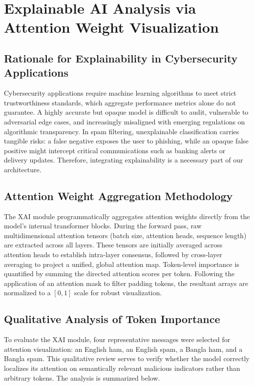 \documentclass[journal]{IEEEtran}
\begin{document}
\section{Explainable AI Analysis via Attention Weight Visualization}

\subsection{Rationale for Explainability in Cybersecurity Applications}

Cybersecurity applications require machine learning algorithms to meet strict trustworthiness standards, which aggregate performance metrics alone do not guarantee. A highly accurate but opaque model is difficult to audit, vulnerable to adversarial edge cases, and increasingly misaligned with emerging regulations on algorithmic transparency. In spam filtering, unexplainable classification carries tangible risks: a false negative exposes the user to phishing, while an opaque false positive might intercept critical communications such as banking alerts or delivery updates. Therefore, integrating explainability is a necessary part of our architecture.

\subsection{Attention Weight Aggregation Methodology}

The XAI module programmatically aggregates attention weights directly from the model's internal transformer blocks. During the forward pass, raw multidimensional attention tensors (batch size, attention heads, sequence length) are extracted across all layers. These tensors are initially averaged across attention heads to establish intra-layer consensus, followed by cross-layer averaging to project a unified, global attention map. Token-level importance is quantified by summing the directed attention scores per token. Following the application of an attention mask to filter padding tokens, the resultant arrays are normalized to a $[0, 1]$ scale for robust visualization.

\subsection{Qualitative Analysis of Token Importance}

To evaluate the XAI module, four representative messages were selected for attention visualization: an English ham, an English spam, a Bangla ham, and a Bangla spam. This qualitative review serves to verify whether the model correctly localizes its attention on semantically relevant malicious indicators rather than arbitrary tokens. The analysis is summarized below.
\end{document}
